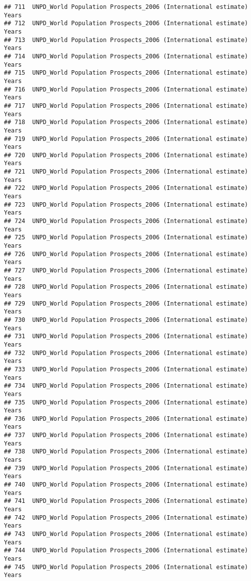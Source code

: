 \documentclass[]{article}
\begin{document}
\begin{verbatim}
## 711  UNPD_World Population Prospects_2006 (International estimate) Years
## 712  UNPD_World Population Prospects_2006 (International estimate) Years
## 713  UNPD_World Population Prospects_2006 (International estimate) Years
## 714  UNPD_World Population Prospects_2006 (International estimate) Years
## 715  UNPD_World Population Prospects_2006 (International estimate) Years
## 716  UNPD_World Population Prospects_2006 (International estimate) Years
## 717  UNPD_World Population Prospects_2006 (International estimate) Years
## 718  UNPD_World Population Prospects_2006 (International estimate) Years
## 719  UNPD_World Population Prospects_2006 (International estimate) Years
## 720  UNPD_World Population Prospects_2006 (International estimate) Years
## 721  UNPD_World Population Prospects_2006 (International estimate) Years
## 722  UNPD_World Population Prospects_2006 (International estimate) Years
## 723  UNPD_World Population Prospects_2006 (International estimate) Years
## 724  UNPD_World Population Prospects_2006 (International estimate) Years
## 725  UNPD_World Population Prospects_2006 (International estimate) Years
## 726  UNPD_World Population Prospects_2006 (International estimate) Years
## 727  UNPD_World Population Prospects_2006 (International estimate) Years
## 728  UNPD_World Population Prospects_2006 (International estimate) Years
## 729  UNPD_World Population Prospects_2006 (International estimate) Years
## 730  UNPD_World Population Prospects_2006 (International estimate) Years
## 731  UNPD_World Population Prospects_2006 (International estimate) Years
## 732  UNPD_World Population Prospects_2006 (International estimate) Years
## 733  UNPD_World Population Prospects_2006 (International estimate) Years
## 734  UNPD_World Population Prospects_2006 (International estimate) Years
## 735  UNPD_World Population Prospects_2006 (International estimate) Years
## 736  UNPD_World Population Prospects_2006 (International estimate) Years
## 737  UNPD_World Population Prospects_2006 (International estimate) Years
## 738  UNPD_World Population Prospects_2006 (International estimate) Years
## 739  UNPD_World Population Prospects_2006 (International estimate) Years
## 740  UNPD_World Population Prospects_2006 (International estimate) Years
## 741  UNPD_World Population Prospects_2006 (International estimate) Years
## 742  UNPD_World Population Prospects_2006 (International estimate) Years
## 743  UNPD_World Population Prospects_2006 (International estimate) Years
## 744  UNPD_World Population Prospects_2006 (International estimate) Years
## 745  UNPD_World Population Prospects_2006 (International estimate) Years

\end{verbatim}
\end{document}
